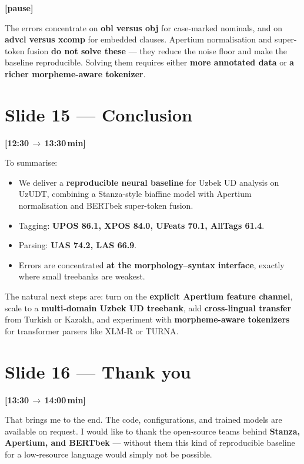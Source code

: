 \documentclass[12pt,a4paper]{article}
\newcommand{\timing}[2]{%
   \par\noindent\textbf{\small [#1\,$\to$\,#2\,min]}\par\vspace{0.2em}}
\newcommand{\say}[1]{\textbf{#1}}
\newcommand{\pause}{\par\vspace{0.4em}\textbf{[pause]}\par}
\begin{document}
\pause

The errors concentrate on \textbf{obl versus obj} for case-marked
nominals, and on \textbf{advcl versus xcomp} for embedded clauses.
Apertium normalisation and super-token fusion \textbf{do not solve
these} --- they reduce the noise floor and make the baseline reproducible.
Solving them requires either \say{more annotated data} or \say{a richer
morpheme-aware tokenizer}.

\section*{Slide 15 --- Conclusion}
\timing{12:30}{13:30}

To summarise:

\begin{itemize}
   \item We deliver a \textbf{reproducible neural baseline} for Uzbek UD analysis on UzUDT, combining a Stanza-style biaffine model with Apertium normalisation and BERTbek super-token fusion.
   \item Tagging: \textbf{UPOS 86.1, XPOS 84.0, UFeats 70.1, AllTags 61.4}.
   \item Parsing: \textbf{UAS 74.2, LAS 66.9}.
   \item Errors are concentrated \textbf{at the morphology--syntax interface}, exactly where small treebanks are weakest.
\end{itemize}

\noindent
The natural next steps are: turn on the \textbf{explicit Apertium
feature channel}, scale to a \textbf{multi-domain Uzbek UD treebank},
add \textbf{cross-lingual transfer} from Turkish or Kazakh, and
experiment with \textbf{morpheme-aware tokenizers} for transformer
parsers like XLM-R or TURNA.

\section*{Slide 16 --- Thank you}
\timing{13:30}{14:00}

That brings me to the end. The code, configurations, and trained models
are available on request. I would like to thank the open-source teams
behind \textbf{Stanza, Apertium, and BERTbek} --- without them this kind
of reproducible baseline for a low-resource language would simply not
be possible.
\end{document}
